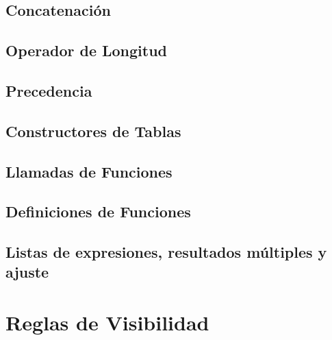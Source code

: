 \subsection{Concatenación}
\lipsum[1-2]

\subsection{Operador de Longitud}
\lipsum[1-2]

\subsection{Precedencia}
\lipsum[1-2]

\subsection{Constructores de Tablas}
\lipsum[1-2]

\subsection{Llamadas de Funciones}
\lipsum[1-2]

\subsection{Definiciones de Funciones}
\lipsum[1-2]

\subsection{Listas de expresiones, resultados múltiples y ajuste}
\lipsum[1-2]


\section{Reglas de Visibilidad}
\lipsum[1-2]
